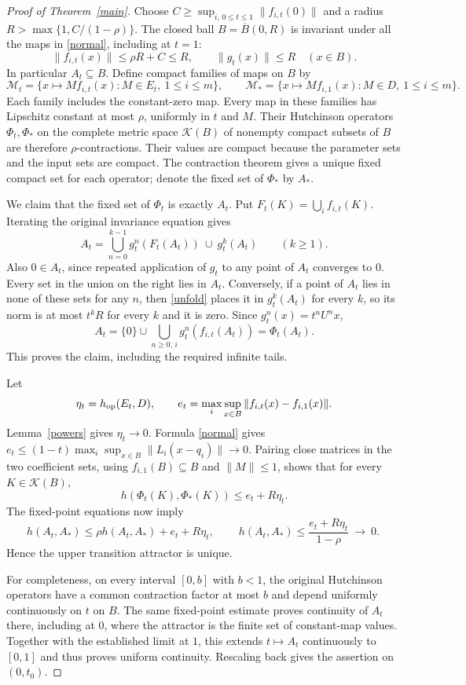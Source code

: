 \documentclass[11pt]{article}
\begin{document}
\begin{proof}[Proof of Theorem~\ref{main}]
Choose $C\ge\sup_{i,\,0\le t\le1}\|f_{i,t}(0)\|$ and a radius
$R>\max\{1,C/(1-\rho)\}$. The closed ball $B=\overline B(0,R)$ is
invariant under all the maps in \eqref{normal}, including at $t=1$:
\[
 \|f_{i,t}(x)\|\le\rho R+C\le R,\qquad \|g_t(x)\|\le R
 \quad(x\in B).
\]
In particular $A_t\subseteq B$. Define compact families of maps on $B$ by
\[
 \mathcal M_t=\{x\mapsto M f_{i,t}(x):M\in E_t,\ 1\le i\le m\},\qquad
 \mathcal M_* =\{x\mapsto M f_{i,1}(x):M\in D,\ 1\le i\le m\}.
\]
Each family includes the constant-zero map. Every map in these families
has Lipschitz constant at most $\rho$, uniformly in $t$ and $M$.
Their Hutchinson operators $\Phi_t,\Phi_*$ on the complete metric space
$\mathcal K(B)$ of nonempty compact subsets of $B$ are therefore
$\rho$-contractions. Their values are compact because the parameter
sets and the input sets are compact. The contraction theorem gives a unique
fixed compact set for each operator; denote the fixed set of $\Phi_*$ by $A_*$.

We claim that the fixed set of $\Phi_t$ is exactly $A_t$. Put
$F_t(K)=\bigcup_i f_{i,t}(K)$. Iterating the original invariance equation gives
\begin{equation}\label{unfold}
 A_t=\bigcup_{n=0}^{k-1}g_t^n(F_t(A_t))\ \cup\ g_t^k(A_t)
 \qquad(k\ge1).
\end{equation}
Also $0\in A_t$, since repeated application of $g_t$ to any point of $A_t$
converges to $0$. Every set in the union on the right lies in $A_t$.
Conversely, if a point of $A_t$ lies in none of these sets for any $n$,
then \eqref{unfold} places it in $g_t^k(A_t)$ for every $k$, so its norm is
at most $t^kR$ for every $k$ and it is zero. Since $g_t^n(x)=t^nU^nx$,
\[
 A_t=\{0\}\cup\bigcup_{n\ge0,\,i}g_t^n(f_{i,t}(A_t))=\Phi_t(A_t).
\]
This proves the claim, including the required infinite tails.

Let
\[
 \eta_t=h_{\rm op}(E_t,D),\qquad
 e_t=\max_i\sup_{x\in B}\|f_{i,t}(x)-f_{i,1}(x)\|.
\]
Lemma~\ref{powers} gives $\eta_t\to0$. Formula \eqref{normal} gives
$e_t\le(1-t)\max_i\sup_{x\in B}\|L_i(x-q_i)\|\to0$.
Pairing close matrices in the two coefficient sets, using
$f_{i,1}(B)\subseteq B$ and $\|M\|\le1$, shows that for every
$K\in\mathcal K(B)$,
\[
 h(\Phi_t(K),\Phi_*(K))\le e_t+R\eta_t.
\]
The fixed-point equations now imply
\[
 h(A_t,A_*)\le \rho h(A_t,A_*)+e_t+R\eta_t,
 \qquad
 \boxed{\ h(A_t,A_*)\le\frac{e_t+R\eta_t}{1-\rho}\ \longrightarrow\ 0.\ }
\]
Hence the upper transition attractor is unique.

For completeness, on every interval $[0,b]$ with $b<1$, the original
Hutchinson operators have a common contraction factor at most $b$ and depend
uniformly continuously on $t$ on $B$. The same fixed-point estimate proves
continuity of $A_t$ there, including at $0$, where the attractor is the
finite set of constant-map values. Together with the established limit at
$1$, this extends $t\mapsto A_t$ continuously to $[0,1]$ and thus proves
uniform continuity. Rescaling back gives the assertion on $(0,t_0)$.
\end{proof}
\end{document}
